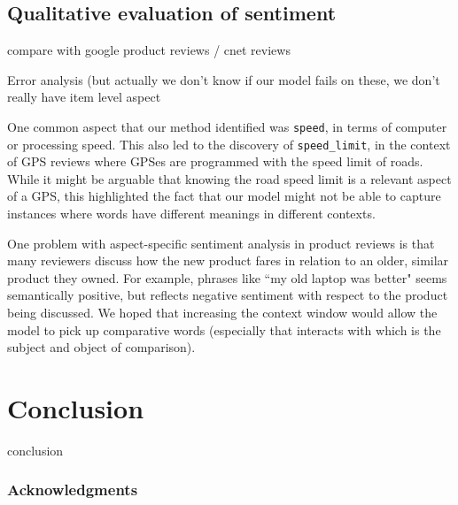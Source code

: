 \documentclass{article} %
\begin{document}



\subsection{Qualitative evaluation of sentiment}

compare with google product reviews / cnet reviews

Error analysis (but actually we don't know if our model fails on these, we don't really have item level aspect

One common aspect that our method identified was \texttt{speed}, in terms of computer or processing speed. This also led to the discovery of \texttt{speed\_limit}, in the context of GPS reviews where GPSes are programmed with the speed limit of roads. While it might be arguable that knowing the road speed limit is a relevant aspect of a GPS, this highlighted the fact that our model might not be able to capture instances where words have different meanings in different contexts.

One problem with aspect-specific sentiment analysis in product reviews is that many reviewers discuss how the new product fares in relation to an older, similar product they owned. For example, phrases like ``my old laptop was better" seems semantically positive, but reflects negative sentiment with respect to the product being discussed. We hoped that increasing the context window would allow the model to pick up comparative words (especially that interacts with which is the subject and object of comparison).



\section{Conclusion}

conclusion







\subsubsection*{Acknowledgments}
\end{document}
